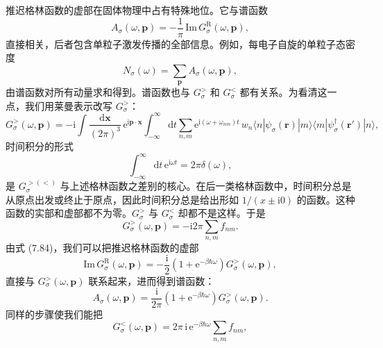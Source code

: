 推迟格林函数的虚部在固体物理中占有特殊地位。它与谱函数
\begin{equation*}
A_{\sigma}(\omega,\mathbf{p})=-\frac{1}{\pi}\,\mathrm{Im}\,G_{\sigma}^{\mathrm{R}}(\omega,\mathbf{p}),\tag{7.87}
\end{equation*}
直接相关，后者包含单粒子激发传播的全部信息。例如，每电子自旋的单粒子态密度
\begin{equation*}
N_{\sigma}(\omega)=\sum_{\mathbf{p}}A_{\sigma}(\omega,\mathbf{p}),\tag{7.88}
\end{equation*}
由谱函数对所有动量求和得到。谱函数也与 $G_{\sigma}^{>}$ 和 $G_{\sigma}^{<}$ 都有关系。为看清这一点，我们用莱曼表示改写 $G_{\sigma}^{>}$：
\begin{equation*}
G_{\sigma}^{>}(\omega,\mathbf{p})=-\mathrm{i}\int\frac{\mathrm{d}\mathbf{x}}{(2\pi)^{3}}\,\mathrm{e}^{\mathrm{i}\mathbf{p}\cdot\mathbf{x}}\int_{-\infty}^{\infty}\mathrm{d}t\sum_{n,m}\mathrm{e}^{\mathrm{i}(\omega+\omega_{nm})t}\,w_{n}\langle n|\psi_{\sigma}(\mathbf{r})|m\rangle\langle m|\psi_{\sigma}^{\dagger}(\mathbf{r}')|n\rangle,\tag{7.89}
\end{equation*}
时间积分的形式
\begin{equation*}
\int_{-\infty}^{\infty}\mathrm{d}t\,\mathrm{e}^{\mathrm{i}\omega t}=2\pi\delta(\omega),\tag{7.90}
\end{equation*}
是 $G_{\sigma}^{>(<)}$ 与上述格林函数之差别的核心。在后一类格林函数中，时间积分总是从原点出发或终止于原点，因此时间积分总是给出形如 $1/(x\pm\mathrm{i}0)$ 的函数。这种函数的实部和虚部都不为零。$G_{\sigma}^{>}$ 与 $G_{\sigma}^{<}$ 却都不是这样。于是
\begin{equation*}
G_{\sigma}^{>}(\omega,\mathbf{p})=-\mathrm{i}2\pi\sum_{n,m}f_{nm}.\tag{7.91}
\end{equation*}
由式 (7.84)，我们可以把推迟格林函数的虚部
\begin{equation*}
\mathrm{Im}\,G_{\sigma}^{\mathrm{R}}(\omega,\mathbf{p})=-\frac{\mathrm{i}}{2}\left(1+\mathrm{e}^{-\beta\hbar\omega}\right)G_{\sigma}^{>}(\omega,\mathbf{p}),\tag{7.92}
\end{equation*}
直接与 $G_{\sigma}^{>}(\omega,\mathbf{p})$ 联系起来，进而得到谱函数：
\begin{equation*}
A_{\sigma}(\omega,\mathbf{p})=\frac{\mathrm{i}}{2\pi}\left(1+\mathrm{e}^{-\beta\hbar\omega}\right)G_{\sigma}^{>}(\omega,\mathbf{p}).\tag{7.93}
\end{equation*}
同样的步骤使我们能把
\begin{equation*}
G_{\sigma}^{<}(\omega,\mathbf{p})=2\pi\,\mathrm{i}\,\mathrm{e}^{-\beta\hbar\omega}\sum_{n,m}f_{nm},\tag{7.94}
\end{equation*}
